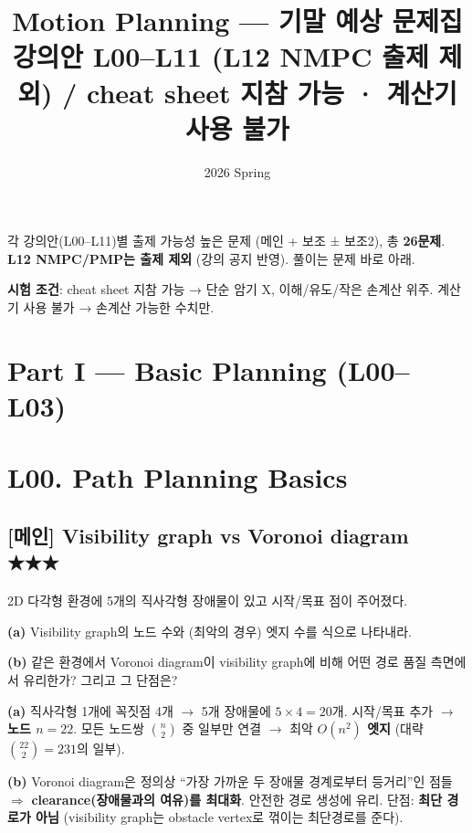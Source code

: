 \documentclass[11pt,a4paper]{article}
\title{\textbf{\Huge Motion Planning --- 기말 예상 문제집}\\[0.3em]
{\large 강의안 L00--L11 (L12 NMPC 출제 제외) / cheat sheet 지참 가능 · 계산기 사용 불가}}
\author{}
\date{2026 Spring}
\begin{document}
\maketitle
\thispagestyle{empty}

\begin{center}
\begin{tcolorbox}[colback=blue!5,colframe=blue!50!black,width=0.9\textwidth,boxrule=0.5pt]
각 강의안(L00--L11)별 출제 가능성 높은 문제 (메인 + 보조 ± 보조2), 총 \textbf{26문제}. \textbf{L12 NMPC/PMP는 출제 제외} (강의 공지 반영). 풀이는 문제 바로 아래.

\smallskip\textbf{시험 조건}: cheat sheet 지참 가능 → 단순 암기 X, 이해/유도/작은 손계산 위주. 계산기 사용 불가 → 손계산 가능한 수치만.
\end{tcolorbox}
\end{center}

\tableofcontents
\newpage

\section*{Part I --- Basic Planning (L00--L03)}

\section{L00. Path Planning Basics}

\subsection*{[메인] Visibility graph vs Voronoi diagram \hfill ★★★}

\begin{prob}
2D 다각형 환경에 5개의 직사각형 장애물이 있고 시작/목표 점이 주어졌다.

\textbf{(a)} Visibility graph의 노드 수와 (최악의 경우) 엣지 수를 식으로 나타내라.

\textbf{(b)} 같은 환경에서 Voronoi diagram이 visibility graph에 비해 어떤 경로 품질 측면에서 유리한가? 그리고 그 단점은?
\end{prob}

\begin{sol}
\textbf{(a)} 직사각형 1개에 꼭짓점 4개 $\to$ 5개 장애물에 $5\times 4 = 20$개. 시작/목표 추가 $\to$ \textbf{노드 $n = 22$}. 모든 노드쌍 $\binom{n}{2}$ 중 일부만 연결 $\to$ 최악 \textbf{$O(n^2)$ 엣지} (대략 $\binom{22}{2} = 231$의 일부).

\textbf{(b)} Voronoi diagram은 정의상 ``가장 가까운 두 장애물 경계로부터 등거리''인 점들 $\Rightarrow$ \textbf{clearance(장애물과의 여유)를 최대화}. 안전한 경로 생성에 유리. 단점: \textbf{최단 경로가 아님} (visibility graph는 obstacle vertex로 꺾이는 최단경로를 준다).
\end{sol}
\end{document}
